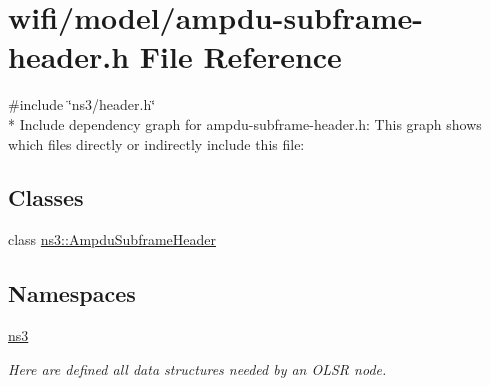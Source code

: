 \hypertarget{ampdu-subframe-header_8h}{}\section{wifi/model/ampdu-\/subframe-\/header.h File Reference}
\label{ampdu-subframe-header_8h}
{\ttfamily \#include \char`\"{}ns3/header.\+h\char`\"{}}\\*
Include dependency graph for ampdu-\/subframe-\/header.h\+:
This graph shows which files directly or indirectly include this file\+:
\subsection*{Classes}
\begin{DoxyCompactItemize}
\item 
class \hyperlink{classns3_1_1AmpduSubframeHeader}{ns3\+::\+Ampdu\+Subframe\+Header}
\end{DoxyCompactItemize}
\subsection*{Namespaces}
\begin{DoxyCompactItemize}
\item 
 \hyperlink{namespacens3}{ns3}
\begin{DoxyCompactList}\small\item\em Here are defined all data structures needed by an O\+L\+SR node. \end{DoxyCompactList}\end{DoxyCompactItemize}
